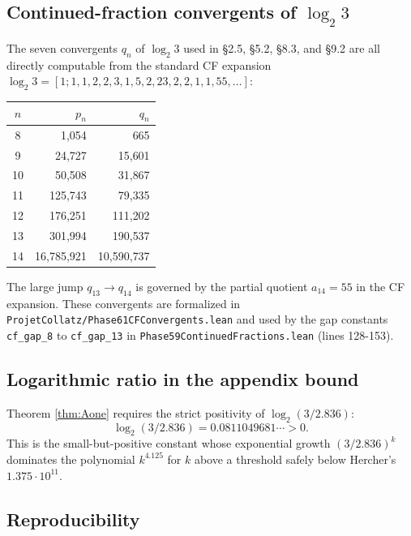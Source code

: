 \documentclass[
  11pt]{amsart}
\theoremstyle{plain}
\theoremstyle{definition}
\theoremstyle{remark}
\begin{document}
\subsection{\texorpdfstring{Continued-fraction convergents of
\(\log_2 3\)}{Continued-fraction convergents of \textbackslash log\_2 3}}\label{continued-fraction-convergents-of-log_2-3}

The seven convergents \(q_n\) of \(\log_2 3\) used in §2.5, §5.2, §8.3,
and §9.2 are all directly computable from the standard CF expansion
\(\log_2 3 = [1; 1, 1, 2, 2, 3, 1, 5, 2, 23, 2, 2, 1, 1, 55, \ldots]\):

\begin{center}
\begin{tabular}{@{}c r r@{}}
\toprule
$n$ & $p_n$ & $q_n$ \\
\midrule
8  & 1{,}054      & 665           \\
9  & 24{,}727     & 15{,}601      \\
10 & 50{,}508     & 31{,}867      \\
11 & 125{,}743    & 79{,}335      \\
12 & 176{,}251    & 111{,}202     \\
13 & 301{,}994    & 190{,}537     \\
14 & 16{,}785{,}921 & 10{,}590{,}737 \\
\bottomrule
\end{tabular}
\end{center}

The large jump \(q_{13} \to q_{14}\) is governed by the partial quotient
\(a_{14} = 55\) in the CF expansion. These convergents are formalized in
\texttt{ProjetCollatz/Phase61CFConvergents.lean} and used by the gap
constants \texttt{cf\_gap\_8} to \texttt{cf\_gap\_13} in
\texttt{Phase59ContinuedFractions.lean} (lines 128-153).

\subsection{Logarithmic ratio in the appendix
bound}\label{logarithmic-ratio-in-the-appendix-bound}

Theorem \ref{thm:Aone} requires the strict positivity of
\(\log_2(3 / 2.836)\): \[
\log_2(3 / 2.836) = 0.0811049681 \cdots > 0.
\] This is the small-but-positive constant whose exponential growth
\((3/2.836)^k\) dominates the polynomial \(k^{4.125}\) for \(k\) above a
threshold safely below Hercher's \(1.375 \cdot 10^{11}\).

\subsection{Reproducibility}\label{reproducibility}
\end{document}

